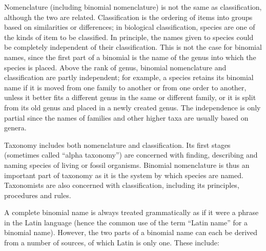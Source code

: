 Nomenclature (including binomial nomenclature) is not the same as classification, although the two are related. Classification is the ordering of items into groups based on similarities or differences; in biological classification, species are one of the kinds of item to be classified. In principle, the names given to species could be completely independent of their classification. This is not the case for binomial names, since the first part of a binomial is the name of the genus into which the species is placed. Above the rank of genus, binomial nomenclature and classification are partly independent; for example, a species retains its binomial name if it is moved from one family to another or from one order to another, unless it better fits a different genus in the same or different family, or it is split from its old genus and placed in a newly created genus. The independence is only partial since the names of families and other higher taxa are usually based on genera.

Taxonomy includes both nomenclature and classification. Its first stages (sometimes called ``alpha taxonomy'') are concerned with finding, describing and naming species of living or fossil organisms. Binomial nomenclature is thus an important part of taxonomy as it is the system by which species are named. Taxonomists are also concerned with classification, including its principles, procedures and rules.

A complete binomial name is always treated grammatically as if it were a phrase in the Latin language (hence the common use of the term ``Latin name'' for a binomial name). However, the two parts of a binomial name can each be derived from a number of sources, of which Latin is only one. These include:


